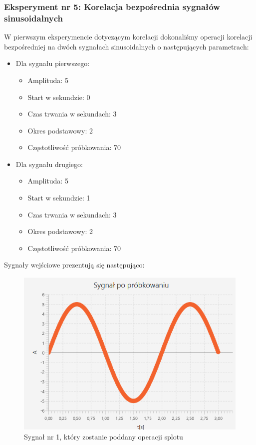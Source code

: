\documentclass[12pt]{article}
\begin{document}
\subsubsection{Eksperyment nr 5: Korelacja bezpośrednia sygnałów sinusoidalnych}
W pierwszym eksperymencie dotyczącym korelacji dokonaliśmy operacji korelacji bezpośredniej na dwóch sygnałach sinusoidalnych o następujących parametrach:
\begin{itemize}
    \item Dla sygnału pierwszego: 
    \begin{itemize}
        \item Amplituda: 5
        \item Start w sekundzie: 0
        \item Czas trwania w sekundach: 3
        \item Okres podstawowy: 2
        \item Częstotliwość próbkowania: 70
    \end{itemize}
    \item Dla sygnału drugiego:
    \begin{itemize}
        \item Amplituda: 5
        \item Start w sekundzie: 1
        \item Czas trwania w sekundach: 3
        \item Okres podstawowy: 2
        \item Częstotliwość próbkowania: 70
    \end{itemize}
\end{itemize}
Sygnały wejściowe prezentują się następująco:
\begin{figure}[H]
    \centering
	\includegraphics[width=\linewidth]{sygnal_po_probkowaniu_1.1.png}
    \caption{Sygnał nr 1, który zostanie poddany operacji splotu}
    \label{Sygnał_5.1}
\end{figure}
\end{document}
